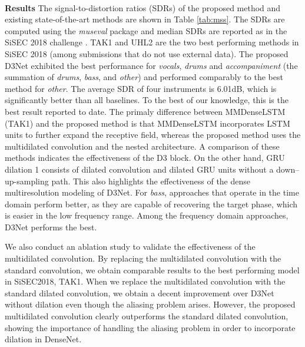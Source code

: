 \documentclass[final]{cvpr}
\begin{document}
\vspace{3mm}\\
\textbf{Results} \hspace{1mm}
The signal-to-distortion ratios (SDRs) of the proposed method and existing state-of-the-art methods are shown in Table \ref{tab:mss}. The SDRs are computed using  the {\it museval} package \cite{sisec2018} and median SDRs are reported as in the SiSEC 2018 challenge \cite{sisec2018}. 
TAK1 \cite{Takahashi18MMDenseLSTM} and UHL2 \cite{Uhlich17} are the two best performing methods in SiSEC 2018 (among submissions that do not use external data).
The proposed D3Net exhibited the best performance for \textit{vocals}, \textit{drums} and  \textit{accompaniment} (the summation of \textit{drums}, \textit{bass}, and \textit{other}) and performed comparably to the best method for \textit{other}. The average SDR of four instruments is 6.01dB, which is significantly better than all baselines. To the best of our knowledge, this is the best result reported to date.
The primaly difference between MMDenseLSTM (TAK1) and the proposed method is that MMDenseLSTM incorporates LSTM units to further expand the receptive field, whereas the proposed method uses the multidilated convolution and the nested architecture. A comparison of these methods indicates the effectiveness of the D3 block.
On the other hand, GRU dilation 1 \cite{Liu19} consists of dilated convolution and dilated GRU units without a down--up-sampling path. This also highlights the effectiveness of the dense multiresolution modeling of D3Net.
For \textit{bass}, approaches that operate in the time domain perform better, as they are capable of recovering the target phase, which is easier in the low frequency range. Among the frequency domain approaches, D3Net performs the best.

We also conduct an ablation study to validate the effectiveness of the multidilated convolution. By replacing the multidilated convolution with the standard convolution, we obtain comparable results to the best performing model in SiSEC2018, TAK1. When we replace the multidilated convolution with the standard dilated convolution, we obtain a decent improvement over D3Net without dilation even though the aliasing problem arises. However, the proposed multidilated convolution clearly outperforms the standard dilated convolution, showing the importance of handling the aliasing problem in order to incorporate dilation in DenseNet. 
\end{document}
